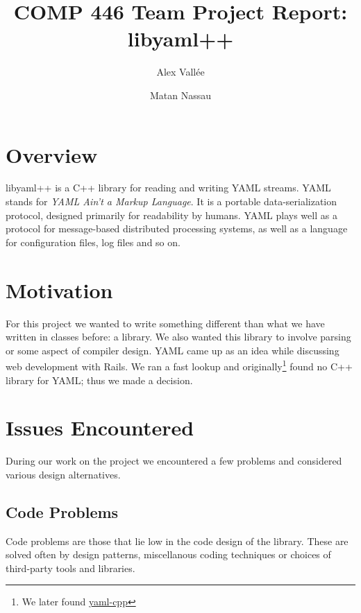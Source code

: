 \documentclass{article}
\author{Alex Vall\'ee \and Matan Nassau}
\title{COMP 446 Team Project Report:  libyaml++}
\begin{document}
\maketitle

\tableofcontents
\pagebreak

\section{Overview}
libyaml++ is a C++ library for reading and writing YAML streams.  YAML stands
for \emph{YAML Ain't a Markup Language}.  It is a portable data-serialization
protocol, designed primarily for readability by humans.  YAML plays well as a
protocol for message-based distributed processing systems, as well as a
language for configuration files, log files and so on.

\section{Motivation}
For this project we wanted to write something different than what we have
written in classes before:  a library.  We also wanted this library to involve
parsing or some aspect of compiler design.  YAML came up as an idea while
discussing web development with Rails.  We ran a fast lookup and
originally\footnote{We later found
\href{http://code.google.com/p/yaml-cpp/}{yaml-cpp} } found no C++ library for
YAML;  thus we made a decision.

\section{Issues Encountered}
During our work on the project we encountered a few problems and considered
various design alternatives.

\subsection{Code Problems}
Code problems are those that lie low in the code design of the library.  These 
are solved often by design patterns, miscellanous coding techniques or choices 
of third-party tools and libraries.
\end{document}

